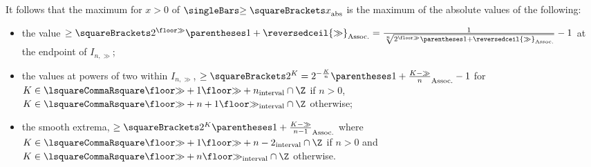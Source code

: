 \documentclass[10pt, a4paper, twoside]{basestyle}
\newcommand\ModOne[1]{\reversedceil{#1}}
\begin{document}
It follows that the maximum for $x>0$ of $\abs{\ge\of{x}}$ is the maximum of the absolute values of the
following:
\begin{itemize}
\item the value $\ge\of{2^{\Floor{\gg}}\pa{1+\ModOne{\gg}}}=
\frac{1}{\sqrt[n]{2^{\Floor{\gg}}\pa{1+\ModOne{\gg}}}}-1$ at the endpoint of $I_{n,\gg}$;
\item the values at powers of two within $I_{n,\gg}$,
$\ge\of{2^K}=2^{-\frac{K}{n}}\pa{1+\frac{K-\gg}{n}}-1$ for
$K\in \intclos{\Floor{\gg}+1}{\Floor{\gg}+n}\Intersection\Z$ if $n>0$,
$K\in \intclos{\Floor{\gg}+n+1}{\Floor{\gg}}\Intersection\Z$ otherwise;
\item the smooth extrema, $\ge\of{2^K\pa{1+\frac{K-\gg}{n-1}}}$ where
$K\in \intclos{\Floor{\gg}+1}{\Floor{\gg}+n-2}\Intersection\Z$ if $n>0$ and
$K\in \intclos{\Floor{\gg}+n}{\Floor{\gg}}\Intersection\Z$ otherwise.
\end{itemize}
\end{document}
